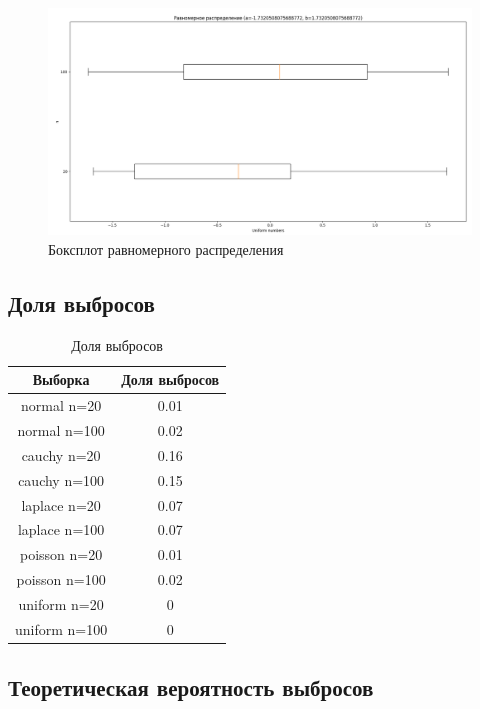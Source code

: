 \begin{figure}[H]
	\centering
	\includegraphics[scale=0.3]{resources/3_uniform.png}
	\caption{Боксплот равномерного распределения}
\end{figure}

\subsection{Доля выбросов}

\begin{table}[H]
	\begin{center}
		\begin{tabular}{|c|c|}
			\hline
			Выборка & Доля выбросов \\
			\hline\hline
			normal n=20 & 0.01\\
			\hline 
			normal n=100 & 0.02\\
			\hline
			cauchy n=20 & 0.16\\
			\hline 
			cauchy n=100 & 0.15\\
			\hline
			laplace n=20 & 0.07\\
			\hline 
			laplace n=100 & 0.07\\
			\hline
			poisson n=20 & 0.01\\
			\hline 
			poisson n=100 & 0.02\\
			\hline
			uniform n=20 & 0\\
			\hline 
			uniform n=100 & 0\\
			\hline
		\end{tabular}
	\end{center}
	\caption{Доля выбросов}
\end{table}

\subsection{Теоретическая вероятность выбросов}

